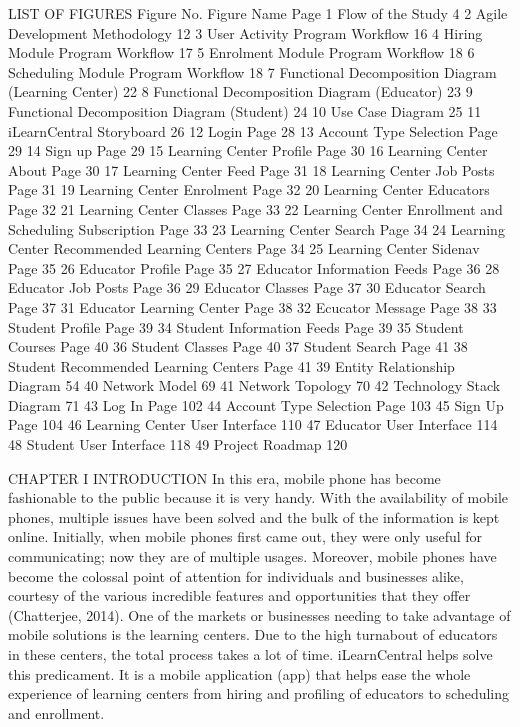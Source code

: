  
LIST OF FIGURES
Figure No.	Figure Name	Page
1	Flow of the Study	4
2	Agile Development Methodology	12
3	User Activity Program Workflow	16
4	Hiring Module Program Workflow	17
5	Enrolment Module Program Workflow	18
6	Scheduling Module Program Workflow	18
7	Functional Decomposition Diagram (Learning Center)	22
8	Functional Decomposition Diagram (Educator) 	23
9	Functional Decomposition Diagram (Student)	24
10	Use Case Diagram	25
11	iLearnCentral Storyboard	26
12	Login Page	28
13	Account Type Selection Page	29
14	Sign up Page	29
15	Learning Center Profile Page	30
16	Learning Center About Page	30
17	Learning Center Feed Page	31
18	Learning Center Job Posts Page	31
19	Learning Center Enrolment Page	32
20	Learning Center Educators Page	32
21	Learning Center Classes Page	33
22	Learning Center Enrollment and Scheduling 	
	Subscription Page	33
23	Learning Center Search Page	34
24	Learning Center Recommended Learning Centers Page	34
25	Learning Center Sidenav Page	35
26	Educator Profile Page	35
27	Educator Information Feeds Page	36
28	Educator Job Posts Page	36
29	Educator Classes Page	37
30	Educator Search Page	37
31	Educator Learning Center Page	38
32	Ecucator Message Page	38
33	Student Profile Page	39
34	Student Information Feeds Page	39
35	Student Courses Page	40
36	Student Classes Page	40
37	Student Search Page	41
38	Student Recommended Learning Centers Page	41
39	Entity Relationship Diagram	54
40	Network Model	69
41	Network Topology	70
42	Technology Stack Diagram	71
43	Log In Page	102
44	Account Type Selection Page	103
45	Sign Up Page	104
46	Learning Center User Interface	110
47	Educator User Interface	114
48	Student User Interface	118
49	Project Roadmap	120



 
CHAPTER I
INTRODUCTION
In this era, mobile phone has become fashionable to the public because it is very handy. With the availability of mobile phones, multiple issues have been solved and the bulk of the information is kept online. Initially, when mobile phones first came out, they were only useful for communicating; now they are of multiple usages. Moreover, mobile phones have become the colossal point of attention for individuals and businesses alike, courtesy of the various incredible features and opportunities that they offer (Chatterjee, 2014).
One of the markets or businesses needing to take advantage of mobile solutions is the learning centers. Due to the high turnabout of educators in these centers, the total process takes a lot of time. iLearnCentral helps solve this predicament. It is a mobile application (app) that helps ease the whole experience of learning centers from hiring and profiling of educators to scheduling and enrollment. 

